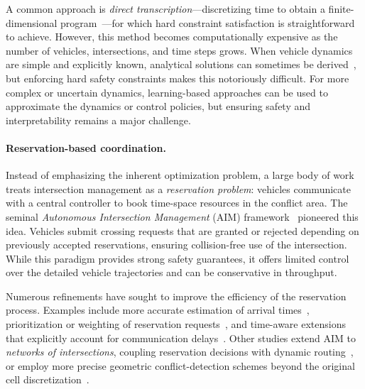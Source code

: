 \documentclass{report}
\theoremstyle{definition}
\theoremstyle{plain}
\begin{document}
A common approach is \emph{direct
  transcription}---discretizing
time to obtain a finite-dimensional program~\cite{kellyIntroductionTrajectoryOptimization2017}---for which hard constraint
satisfaction is straightforward to achieve. However, this method becomes
computationally expensive as the number of vehicles, intersections, and time
steps grows.
%
When vehicle dynamics are simple and explicitly known, analytical solutions can
sometimes be derived~\cite{hartlSurveyMaximumPrinciples1995}, but enforcing hard
safety constraints makes this notoriously difficult. For more complex or
uncertain dynamics, learning-based approaches can be used to approximate the
dynamics or control policies, but ensuring safety and interpretability remains a
major challenge.

\paragraph{Reservation-based coordination.}

Instead of emphasizing the inherent optimization problem,
a large body of work treats intersection management as a \emph{reservation problem}:
vehicles communicate with a central controller to book time-space resources in
the conflict area. The seminal \emph{Autonomous Intersection Management} (AIM)
framework~\cite{dresnerMultiagentTrafficManagement2004,dresnerMultiagentApproachAutonomous2008}
pioneered this idea. Vehicles submit crossing requests that are granted or
rejected depending on previously accepted reservations, ensuring collision-free
use of the intersection. While this paradigm provides strong safety guarantees,
it offers limited control over the detailed vehicle trajectories and can be
conservative in throughput.

Numerous refinements have sought to improve the efficiency of the reservation
process. Examples include more accurate estimation of arrival
times~\cite{auMotionPlanningAlgorithms2010}, prioritization or weighting of
reservation requests~\cite{huangAssessingMobilityEnvironmental2012}, and
time-aware extensions that explicitly account for communication
delays~\cite{khayatianCrossroadsTimeawareApproach2020}. Other studies extend AIM
to \emph{networks of intersections}, coupling reservation decisions with dynamic
routing~\cite{hausknechtAutonomousIntersectionManagement2011}, or employ more
precise geometric conflict-detection schemes beyond the original cell
discretization~\cite{levinConflictpointFormulationIntersection2017,liTemporalspatialDimensionExtensionbased2019}.
\end{document}
